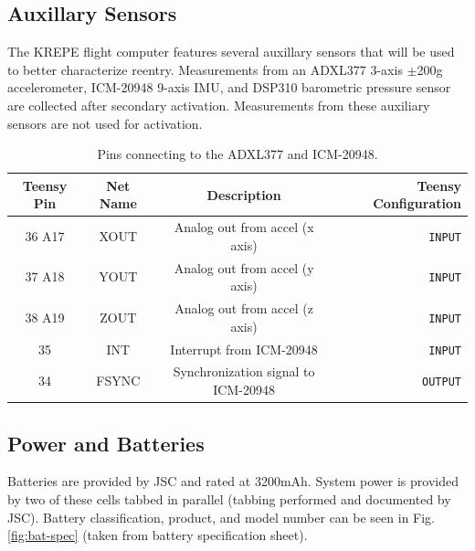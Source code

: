 \documentclass{article}
\begin{document}
\subsection{Auxillary Sensors}
The KREPE flight computer features several auxillary sensors that will be used to better characterize reentry. Measurements from an ADXL377 3-axis $\pm$200g accelerometer, ICM-20948 9-axis IMU, and DSP310 barometric pressure sensor are collected after secondary activation. Measurements from these auxiliary sensors are not used for activation.

\begin{table}[H]
    \centering
    \caption{Pins connecting to the ADXL377 and ICM-20948.}
    \label{tab:pins_motionsensor}
    \begin{tabular}{c|c|c|r}
    Teensy Pin & Net Name  & Description   & Teensy Configuration \\
    \hline 
    36 A17 & XOUT & Analog out from accel (x axis) & \texttt{INPUT} \\
    37 A18 & YOUT & Analog out from accel (y axis) & \texttt{INPUT} \\
    38 A19 & ZOUT & Analog out from accel (z axis) & \texttt{INPUT} \\
    35 & INT & Interrupt from ICM-20948 & \texttt{INPUT} \\
    34 & FSYNC & Synchronization signal to ICM-20948 & \texttt{OUTPUT} 
    \end{tabular}
\end{table}




\subsection{Power and Batteries}
Batteries are provided by JSC and rated at 3200mAh. System power is provided by two of these cells tabbed in parallel (tabbing performed and documented by JSC). Battery classification, product, and model number can be seen in Fig. \ref{fig:bat-spec} (taken from battery specification sheet).
\end{document}
